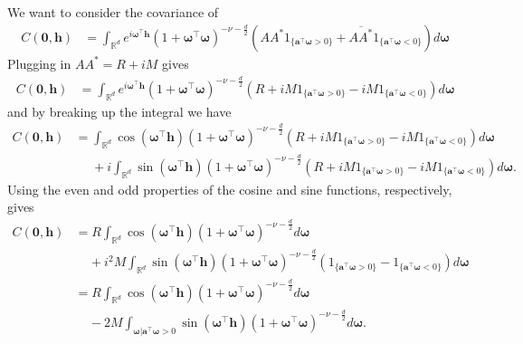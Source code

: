 \documentclass[11pt]{article}
\newcommand{\vlen}{\boldsymbol{h}}
\newcommand{\vint}{\boldsymbol{\omega}}
\newcommand{\vpla}{\boldsymbol{a}}
\begin{document}
We want to consider the covariance of \begin{align*}
C(\boldsymbol{0}, \boldsymbol{h}) &= \int_{\mathbb{R}^d} e^{i \vint^\top \vlen} (1 +\vint^\top \vint )^{-\nu- \frac{d}{2}} \left(AA^* 1_{\{\vpla^\top \vint > 0\}} + \overline{AA^*} 1_{\{\vpla^\top\vint < 0\}}\right) d\vint%
\end{align*}
Plugging in $AA^* = R + iM$ gives
\begin{align*}
C(\boldsymbol{0}, \boldsymbol{h})&=\int_{\mathbb{R}^d} e^{i \vint^\top \boldsymbol{h}}(1 + \vint^\top \vint)^{-\nu- \frac{d}{2}} \left(R + iM1_{\{\vpla^\top\vint > 0\}}  - iM1_{\{\vpla^\top\vint < 0\}}\right) d\vint\end{align*}
and by breaking up the integral we have
\begin{align*}
C(\boldsymbol{0}, \boldsymbol{h})%
&=\int_{\mathbb{R}^d}\cos(\vint^\top \boldsymbol{h})(1 + \vint^\top \vint)^{-\nu- \frac{d}{2}} \left(R + iM1_{\{\vpla^\top\vint > 0\}}  - iM1_{\{\vpla^\top\vint < 0\}}\right) d\vint \\
&\ \ \ \ \ \ +i\int_{\mathbb{R}^d}\sin(\vint^\top \boldsymbol{h})(1 + \vint^\top \vint)^{-\nu- \frac{d}{2}} \left(R + iM1_{\{\vpla^\top\vint > 0\}}  - iM1_{\{\vpla^\top\vint < 0\}}\right) d\vint.\end{align*}
Using the even and odd properties of the cosine and sine functions, respectively, gives
\begin{align*}
C(\boldsymbol{0}, \boldsymbol{h})&=R\int_{\mathbb{R}^d}\cos(\vint^\top \boldsymbol{h})(1 + \vint^\top \vint)^{-\nu- \frac{d}{2}} d\vint \\
& \ \ \ \ \ + i^2M\int_{\mathbb{R}^d}\sin(\vint^\top \boldsymbol{h})(1 + \vint^\top \vint)^{-\nu- \frac{d}{2}} \left(1_{\{\vpla^\top\vint > 0\}}  - 1_{\{\vpla^\top\vint < 0\}}\right) d\vint \\
&=R\int_{\mathbb{R}^d}\cos(\vint^\top \boldsymbol{h})(1 + \vint^\top \vint)^{-\nu- \frac{d}{2}} d\vint \\
& \ \ \ \ \ -2M\int_{\vint | \vpla^\top\vint > 0}\sin(\vint^\top \boldsymbol{h})(1 + \vint^\top \vint)^{-\nu- \frac{d}{2}} d\vint .%
\end{align*}%
\end{document}
